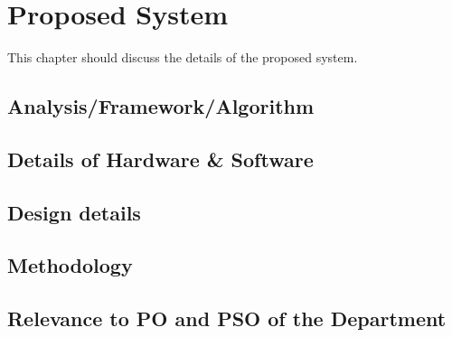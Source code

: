 \chapter{Proposed System}
This chapter should discuss the details of the proposed system.
	

\section{Analysis/Framework/Algorithm}


\section{Details of Hardware \& Software}

\section{Design details}

\section{Methodology}

\section{Relevance to PO and PSO of the Department}



